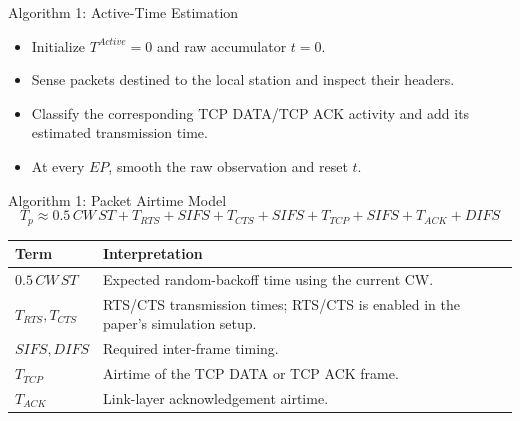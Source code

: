 \begin{frame}{Algorithm 1: Active-Time Estimation}
\begin{center}
\end{center}
\vspace{0.45cm}
\begin{itemize}
\item Initialize $T^{Active}=0$ and raw accumulator $t=0$.
\item Sense packets destined to the local station and inspect their headers.
\item Classify the corresponding TCP DATA/TCP ACK activity and add its estimated transmission time.
\item At every $EP$, smooth the raw observation and reset $t$.
\end{itemize}
\end{frame}

\begin{frame}{Algorithm 1: Packet Airtime Model}
\fontsize{9}{10.8}\selectfont
\[
T_p\approx 0.5\,CW\,ST+T_{RTS}+SIFS+T_{CTS}+SIFS+T_{TCP}+SIFS+T_{ACK}+DIFS
\]
\begin{tabular}{p{3.2cm}p{8.2cm}}
\toprule
\textbf{Term} & \textbf{Interpretation}\\
\midrule
$0.5\,CW\,ST$ & Expected random-backoff time using the current CW.\\
$T_{RTS},T_{CTS}$ & RTS/CTS transmission times; RTS/CTS is enabled in the paper's simulation setup.\\
$SIFS,DIFS$ & Required inter-frame timing.\\
$T_{TCP}$ & Airtime of the TCP DATA or TCP ACK frame.\\
$T_{ACK}$ & Link-layer acknowledgement airtime.\\
\bottomrule
\end{tabular}
\vspace{0.22cm}
\end{frame}


